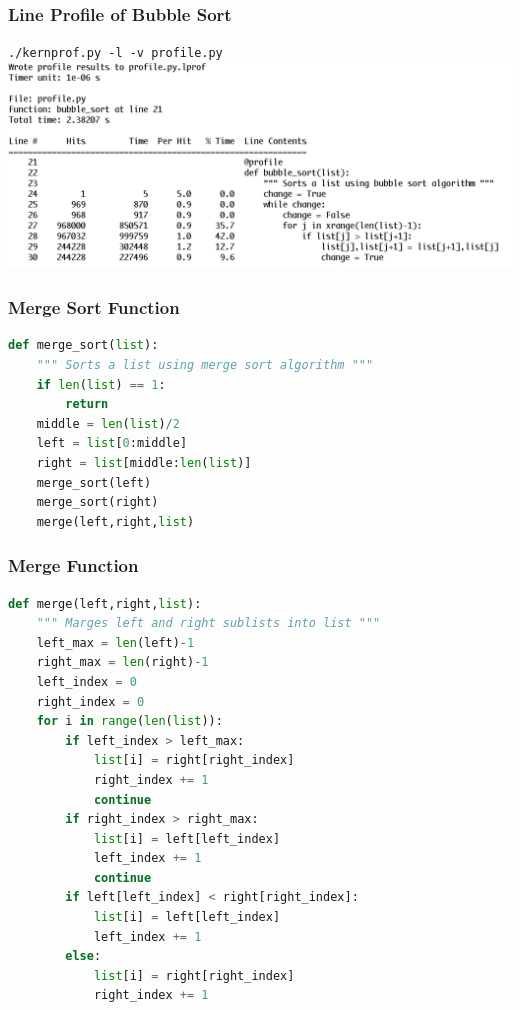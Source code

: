 \documentclass[xcolor=table,10pt,final]{beamer}
\begin{document}
\begin{frame}[fragile]
	\frametitle{Line Profile of Bubble Sort}
	{\tt ./kernprof.py -l -v profile.py} \newline \newline
	\centering \includegraphics[scale=0.3]{profile}	
\end{frame}

\begin{frame}[fragile]
	\frametitle{Merge Sort Function}
	\begin{lstlisting}[language=Python]
def merge_sort(list):
    """ Sorts a list using merge sort algorithm """
    if len(list) == 1:
        return
    middle = len(list)/2
    left = list[0:middle]
    right = list[middle:len(list)]
    merge_sort(left)
    merge_sort(right)
    merge(left,right,list)
	\end{lstlisting}
\end{frame}

\begin{frame}[fragile]
	\frametitle{Merge Function}
	\begin{lstlisting}[language=Python]
def merge(left,right,list):
    """ Marges left and right sublists into list """
    left_max = len(left)-1
    right_max = len(right)-1
    left_index = 0
    right_index = 0
    for i in range(len(list)):
        if left_index > left_max:
            list[i] = right[right_index]
            right_index += 1
            continue
        if right_index > right_max:
            list[i] = left[left_index]
            left_index += 1
            continue
        if left[left_index] < right[right_index]:
            list[i] = left[left_index]
            left_index += 1
        else:
            list[i] = right[right_index]
            right_index += 1
	\end{lstlisting}
\end{frame}
\end{document}
